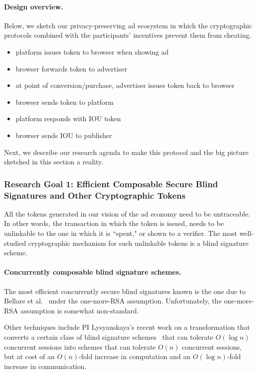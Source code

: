 \paragraph{Design overview.}
%
Below, we sketch our privacy-preserving ad ecosystem in which the cryptographic protocols combined with the participants' incentives prevent them from cheating.
%


\begin{itemize}
 \item platform issues token to browser when showing ad
 \item browser forwards token to advertiser
 \item at point of conversion/purchase, advertiser issues token back to browser
 \item browser sends token to platform
 \item platform responds with IOU token
 \item browser sends IOU to publisher
\end{itemize}


Next, we describe our research agenda to make this protocol and the big picture sketched in this section a reality.

\subsubsection{Research Goal 1: Efficient Composable Secure Blind Signatures and Other Cryptographic Tokens}

All the tokens generated in our vision of the ad economy need to be untraceable.  In other words, the transaction in which the token is issued, needs to be unlinkable to the one in which it is ``spent," or shown to a verifier.  The most well-studied cryptographic mechanism for such unlinkable tokens is a blind signature scheme.  

\paragraph{Concurrently composable blind signature schemes.} The most efficient concurrently secure blind signatures known is the one due to Bellare et al.~\cite{} under the one-more-RSA assumption.  Unfortunately, the one-more-RSA assumption is somewhat non-standard.  

Other techniques include PI Lysyanskaya's recent work on a transformation that converts a certain class of blind signature schemes~\cite{} that can tolerate $O(\log n)$ concurrent sessions into schemes that can tolerate $O(n)$ concurrent sessions, but at cost of an $O(n)$-fold increase in computation and an $O(\log n)$-fold increase in communication.  

